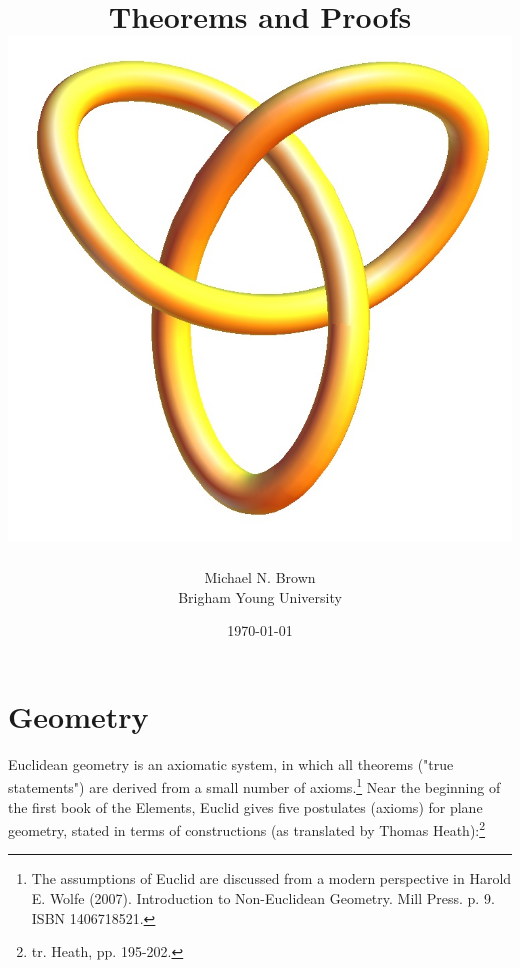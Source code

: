\documentclass[10pt]{report}
\begin{document}
\medskip

\title{Theorems and Proofs\\ \includegraphics[scale=.333333]{Trefoil_Knot}}

\author{Michael N. Brown\\
  Brigham Young University}
\date{\today}
\maketitle

\tableofcontents

\part{Geometry}
Euclidean geometry is an axiomatic system, in which all theorems ("true statements") are derived from a small number of axioms.\footnote{The assumptions of Euclid are discussed from a modern perspective in Harold E. Wolfe (2007). Introduction to Non-Euclidean Geometry. Mill Press. p. 9. ISBN 1406718521.} Near the beginning of the first book of the Elements, Euclid gives five postulates (axioms) for plane geometry, stated in terms of constructions (as translated by Thomas Heath):\footnote{tr. Heath, pp. 195-202.}
\end{document}
